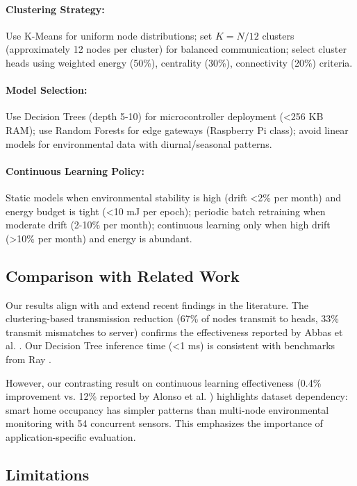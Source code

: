 \documentclass[12pt,a4paper]{article}
\begin{document}
\paragraph{Clustering Strategy:}
Use K-Means for uniform node distributions; set $K = N/12$ clusters (approximately 12 nodes per cluster) for balanced communication; select cluster heads using weighted energy (50\%), centrality (30\%), connectivity (20\%) criteria.

\paragraph{Model Selection:}
Use Decision Trees (depth 5-10) for microcontroller deployment (<256 KB RAM); use Random Forests for edge gateways (Raspberry Pi class); avoid linear models for environmental data with diurnal/seasonal patterns.

\paragraph{Continuous Learning Policy:}
Static models when environmental stability is high (drift <2\% per month) and energy budget is tight (<10 mJ per epoch); periodic batch retraining when moderate drift (2-10\% per month); continuous learning only when high drift (>10\% per month) and energy is abundant.

\subsection{Comparison with Related Work}

Our results align with and extend recent findings in the literature. The clustering-based transmission reduction (67\% of nodes transmit to heads, 33\% transmit mismatches to server) confirms the effectiveness reported by Abbas et al. \cite{Abbas2023EnergyAwareClustering}. Our Decision Tree inference time (<1 ms) is consistent with benchmarks from Ray \cite{Ray2022TinyMLDeployment}.

However, our contrasting result on continuous learning effectiveness (0.4\% improvement vs. 12\% reported by Alonso et al. \cite{Alonso2024OnlineLearning}) highlights dataset dependency: smart home occupancy has simpler patterns than multi-node environmental monitoring with 54 concurrent sensors. This emphasizes the importance of application-specific evaluation.

\subsection{Limitations}
\end{document}
